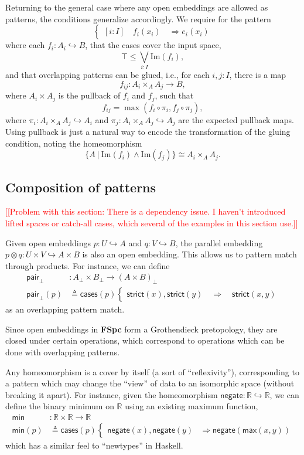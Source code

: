 \documentclass[conference]{IEEEtran}
\newcommand{\hookto}{\hookrightarrow}
\newcommand{\R}{\mathbb{R}}
\newcommand{\suchthat}{\ |\ }
\newcommand{\Img}[1]{\text{Im}\left({#1}\right)}
\newcommand{\negate}{\mathsf{negate}}
\newcommand{\Branch}{\Rightarrow}
\newcommand{\note}[1]{\textcolor{red}{[[{#1}]]}}
\begin{document}
Returning to the general case where any open embeddings are allowed as patterns, the conditions generalize accordingly. We require for the pattern
\[
\begin{cases}
[i : I] \quad f_i(x_i) \quad \Branch e_i(x_i)
\end{cases}
\]
where each $f_i : A_i \hookto B$, that the cases cover the input space,
\[
\top \le \bigvee_{i : I} \Img{f_i},
\]
and that overlapping patterns can be glued, i.e., for each $i, j : I$, there is a map
\[
f_{ij} : A_i \times_A A_j \to B,
\]
where $A_i \times A_j$ is the pullback of $f_i$ and $f_j$, such that 
\[
f_{ij} = \max(f_i \circ \pi_i, f_j \circ \pi_j),
\]
where $\pi_i : A_i \times_A A_j \hookto A_i$ and $\pi_j : A_i \times_A A_j \hookto A_j$ are the expected pullback maps. Using pullback is just a natural way to encode the transformation of the gluing condition, noting the homeomorphism
\[
 \{A \suchthat \Img{f_i} \wedge \Img{f_j} \} \cong A_i \times_A A_j.
\]

\subsection{Composition of patterns}

\note{Problem with this section: There is a dependency issue. I haven't introduced lifted spaces or catch-all cases, which several of the examples in this section use.}

Given open embeddings $p : U \hookto A$ and $q : V \hookto B$, the parallel embedding $p \otimes q : U \times V \hookto A \times B$ is also an open embedding. This allows us to pattern match through products. 
For instance, we can define
\begin{align*}
 \mathsf{pair}_\bot &: A_\bot \times B_\bot \to \left( A \times B \right)_\bot
\\ \mathsf{pair}_\bot(p) &\triangleq \mathsf{cases}(p)
\begin{cases}
\mathsf{strict}(x) , \mathsf{strict}(y)
  \quad \Branch \quad \mathsf{strict}(x, y)
\end{cases}
\end{align*}
as an overlapping pattern match.

Since open embeddings in \textbf{FSpc} form a Grothendieck pretopology, they are closed under certain operations, which correspond to operations which can be done with overlapping patterns.

Any homeomorphism is a cover by itself (a sort of ``reflexivity''), corresponding to a pattern which may change the ``view'' of data to an isomorphic space (without breaking it apart). For instance, given the homeomorphism $\negate : \R \hookto \R$, we can define the binary minimum on $\R$ using an existing maximum function,
\begin{align*}
\mathsf{min} &: \R \times \R \to \R
\\ \mathsf{min}(p) &\triangleq \mathsf{cases}(p)
\begin{cases}
\negate(x), \negate(y) &\Branch \negate(\mathsf{max}(x, y))
\end{cases}
\end{align*}
which has a similar feel to ``newtypes'' in Haskell.
\end{document}
